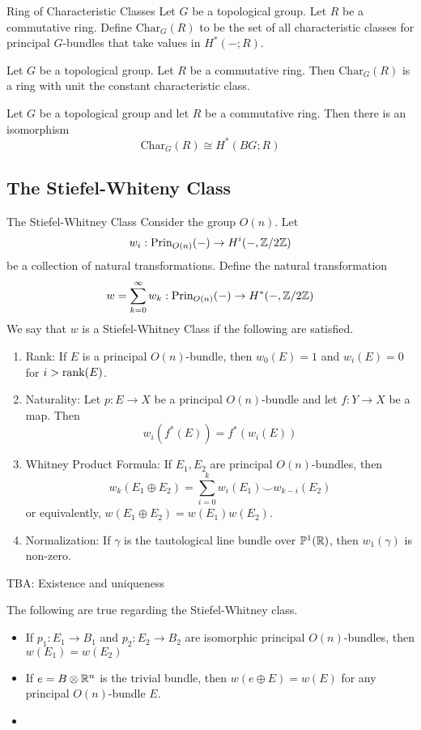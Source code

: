 \documentclass[a4paper]{article}
\begin{document}
\begin{defn}{Ring of Characteristic Classes}{} Let $G$ be a topological group. Let $R$ be a commutative ring. Define $\text{Char}_G(R)$ to be the set of all characteristic classes for principal $G$-bundles that take values in $H^\ast(-;R)$. 
\end{defn}

\begin{prp}{}{} Let $G$ be a topological group. Let $R$ be a commutative ring. Then $\text{Char}_G(R)$ is a ring with unit the constant characteristic class. 
\end{prp}

\begin{thm}{}{} Let $G$ be a topological group and let $R$ be a commutative ring. Then there is an isomorphism $$\text{Char}_G(R)\cong H^\ast(BG;R)$$
\end{thm}

\subsection{The Stiefel-Whiteny Class}
\begin{defn}{The Stiefel-Whitney Class}{} Consider the group $O(n)$. Let $$w_i:\text{Prin}_{O(n)}(-)\to H^i(-,\mathbb{Z}/2\mathbb{Z})$$ be a collection of natural transformations. Define  the natural transformation $$w=\sum_{k=0}^\infty w_k:\text{Prin}_{O(n)}(-)\to H^\ast(-,\mathbb{Z}/2\mathbb{Z})$$ We say that $w$ is a Stiefel-Whitney Class if the following are satisfied. 
\begin{enumerate}
\item Rank: If $E$ is a principal $O(n)$-bundle, then $w_0(E)=1$ and $w_i(E)=0$ for $i>\rank(E)$. 
\item Naturality: Let $p:E\to X$ be a principal $O(n)$-bundle and let $f:Y\to X$ be a map. Then $$w_i(f^\ast(E))=f^\ast(w_i(E))$$
\item Whitney Product Formula: If $E_1,E_2$ are principal $O(n)$-bundles, then $$w_k(E_1\oplus E_2)=\sum_{i=0}^kw_i(E_1)\smile w_{k-i}(E_2)$$ or equivalently, $w(E_1\oplus E_2)=w(E_1)w(E_2)$. 
\item Normalization: If $\gamma$ is the tautological line bundle over $\mathbb{P}^1(\mathbb{R})$, then $w_1(\gamma)$ is non-zero. 
\end{enumerate}
\end{defn}

TBA: Existence and uniqueness

\begin{prp}{}{} The following are true regarding the Stiefel-Whitney class. 
\begin{itemize}
\item If $p_1:E_1\to B_1$ and $p_2:E_2\to B_2$ are isomorphic principal $O(n)$-bundles, then $w(E_1)=w(E_2)$
\item If $e=B\otimes\mathbb{R}^n$ is the trivial bundle, then $w(e\oplus E)=w(E)$ for any principal $O(n)$-bundle $E$. 
\item 
\end{itemize}
\end{prp}
\end{document}
